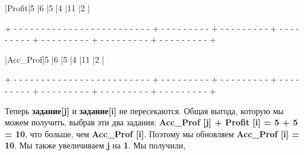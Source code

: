 \begin{tcolorbox}
\hspace{0.4mm}|\hspace{17.6mm}Profit\hspace{17.6mm}|\hspace{7.1mm}5\hspace{7.1mm} |\hspace{7.1mm}6\hspace{7.1mm} |\hspace{7.1mm}5\hspace{7.1mm} |\hspace{7.1mm}4\hspace{7.1mm} |\hspace{5.8mm}11\hspace{5.8mm} |\hspace{7.1mm}2\hspace{7.1mm} |

{\tiny{+ - - - - - - - - - - - - - - - - - - - - - - - - - + - - - - - - - - - + - - - - - - - - - + - - - - - - - - - + - - - - - - - - - + - - - - - - - - - + - - - - - - - - - +}}

\hspace{0.4mm}|\hspace{14mm}Acc\_Prof\hspace{14mm}|\hspace{7.1mm}5\hspace{7.1mm} |\hspace{7.1mm}6\hspace{7.1mm} |\hspace{7.1mm}5\hspace{7.1mm} |\hspace{7.1mm}4\hspace{7.1mm} |\hspace{5.8mm}11\hspace{5.8mm} |\hspace{7.1mm}2\hspace{7.1mm} |

{\tiny{+ - - - - - - - - - - - - - - - - - - - - - - - - - + - - - - - - - - - + - - - - - - - - - + - - - - - - - - - + - - - - - - - - - + - - - - - - - - - + - - - - - - - - - +}}
\end{tcolorbox}

\vspace{\baselineskip}
Теперь \textbf{задание[j]} и \textbf{задание[i]} не пересекаются. Общая выгода, которую мы можем получить, выбрав эти два задания: \textbf{Acc\_Prof [j] + Profit [i] = 5 + 5 = 10}, что больше, чем \textbf{Acc\_Prof [i]}. Поэтому мы обновляем \textbf{Acc\_Prof [i] = 10}. Мы также увеличиваем \textbf{j} на \textbf{1}. Мы получили, 

